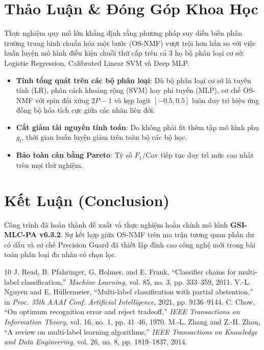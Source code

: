 \documentclass[10pt,a4paper,twoside]{article}
\begin{document}
\section{Thảo Luận \& Đóng Góp Khoa Học}
Thực nghiệm quy mô lớn khẳng định rằng phương pháp suy diễn biến phân trường trung bình chuẩn hóa một bước (OS-NMF) vượt trội hơn hẳn so với việc huấn luyện mô hình điều kiện chuỗi thứ cấp trên cả 3 họ bộ phân loại cơ sở: Logistic Regression, Calibrated Linear SVM và Deep MLP.
\begin{itemize}[leftmargin=*]
    \item \textbf{Tính tổng quát trên các bộ phân loại}: Dù bộ phân loại cơ sở là tuyến tính (LR), phân cách khoảng rộng (SVM) hay phi tuyến (MLP), cơ chế OS-NMF với spin đối xứng $2P-1$ và kẹp logit $[-0.5, 0.5]$ luôn duy trì hiệu ứng đồng bộ hóa tích cực giữa các nhãn liên đới.
    \item \textbf{Cắt giảm tài nguyên tính toán}: Do không phải fit thêm tập mô hình phụ $g_l$, thời gian huấn luyện giảm trên toàn bộ các bộ học.
    \item \textbf{Bảo toàn cân bằng Pareto}: Tỷ số $F_1/\text{Cov}$ tiếp tục duy trì mức cao nhất trên mọi thử nghiệm.
\end{itemize}

\section{Kết Luận (Conclusion)}
Công trình đã hoàn thành đề xuất và thực nghiệm hoàn chỉnh mô hình \textbf{GSI-MLC-PA v6.3.2}. Sự kết hợp giữa OS-NMF trên ma trận tương quan phần dư có dấu và cơ chế Precision Guard đã thiết lập đỉnh cao công nghệ mới trong bài toán phân loại đa nhãn có chọn lọc.

\begin{thebibliography}{10}
 J. Read, B. Pfahringer, G. Holmes, and E. Frank, ``Classifier chains for multi-label classification,'' \textit{Machine Learning}, vol. 85, no. 3, pp. 333--359, 2011.
 V.-L. Nguyen and E. H{\"u}llermeier, ``Multi-label classification with partial abstention,'' in \textit{Proc. 35th AAAI Conf. Artificial Intelligence}, 2021, pp. 9136--9144.
 C. Chow, ``On optimum recognition error and reject tradeoff,'' \textit{IEEE Transactions on Information Theory}, vol. 16, no. 1, pp. 41--46, 1970.
 M.-L. Zhang and Z.-H. Zhou, ``A review on multi-label learning algorithms,'' \textit{IEEE Transactions on Knowledge and Data Engineering}, vol. 26, no. 8, pp. 1819--1837, 2014.
\end{thebibliography}
\end{document}
